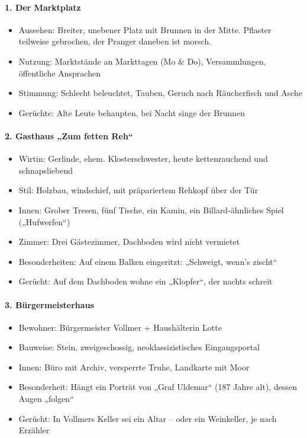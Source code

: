 \paragraph{1. Der Marktplatz}
\begin{itemize}
\item Aussehen: Breiter, unebener Platz mit Brunnen in der Mitte. Pflaster teilweise gebrochen, der Pranger daneben ist morsch.
\item Nutzung: Marktstände an Markttagen (Mo \& Do), Versammlungen, öffentliche Ansprachen
\item Stimmung: Schlecht beleuchtet, Tauben, Geruch nach Räucherfisch und Asche
\item Gerüchte: Alte Leute behaupten, bei Nacht singe der Brunnen
\end{itemize}
\paragraph{2. Gasthaus „Zum fetten Reh“}
\begin{itemize}
\item Wirtin: Gerlinde, ehem. Klosterschwester, heute kettenrauchend und schnapsliebend
\item Stil: Holzbau, windschief, mit präpariertem Rehkopf über der Tür
\item Innen: Grober Tresen, fünf Tische, ein Kamin, ein Billard-ähnliches Spiel („Hufwerfen“)
\item Zimmer: Drei Gästezimmer, Dachboden wird nicht vermietet
\item Besonderheiten: Auf einem Balken eingeritzt: „Schweigt, wenn’s zischt“
\item Gerücht: Auf dem Dachboden wohne ein „Klopfer“, der nachts schreit
\end{itemize}

\paragraph{3. Bürgermeisterhaus}
\begin{itemize}
\item Bewohner: Bürgermeister Vollmer + Haushälterin Lotte
\item Bauweise: Stein, zweigeschossig, neoklassizistisches Eingangsportal
\item Innen: Büro mit Archiv, versperrte Truhe, Landkarte mit Moor
\item Besonderheit: Hängt ein Porträt von „Graf Uldemar“ (187 Jahre alt), dessen Augen „folgen“
\item Gerücht: In Vollmers Keller sei ein Altar – oder ein Weinkeller, je nach Erzähler
\end{itemize}

